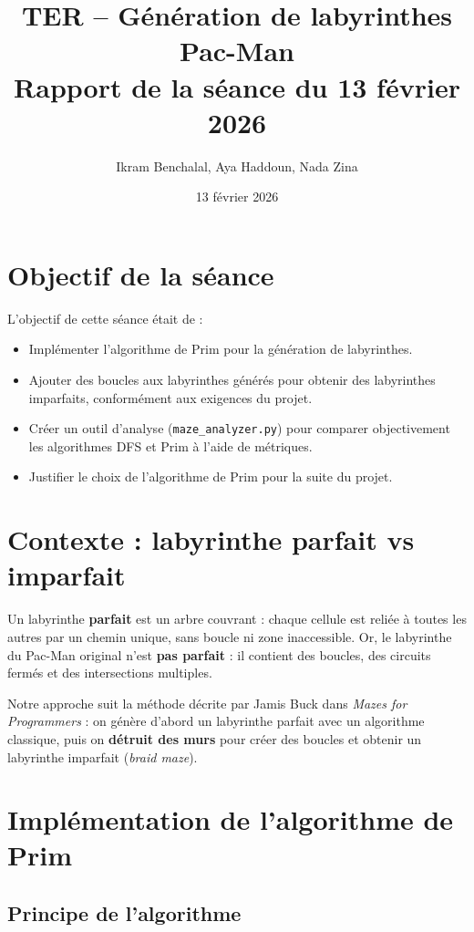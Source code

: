 \documentclass[12pt,a4paper]{article}
\title{TER -- Génération de labyrinthes Pac-Man\\
\large Rapport de la séance du 13 février 2026}
\author{Ikram Benchalal, Aya Haddoun, Nada Zina}
\date{13 février 2026}
\begin{document}
\maketitle

\section{Objectif de la séance}

L'objectif de cette séance était de :
\begin{itemize}
    \item Implémenter l'algorithme de Prim pour la génération de labyrinthes.
    \item Ajouter des boucles aux labyrinthes générés pour obtenir des labyrinthes imparfaits, conformément aux exigences du projet.
    \item Créer un outil d'analyse (\texttt{maze\_analyzer.py}) pour comparer objectivement les algorithmes DFS et Prim à l'aide de métriques.
    \item Justifier le choix de l'algorithme de Prim pour la suite du projet.
\end{itemize}

\section{Contexte : labyrinthe parfait vs imparfait}

Un labyrinthe \textbf{parfait} est un arbre couvrant : chaque cellule est reliée à toutes les autres par un chemin unique, sans boucle ni zone inaccessible. Or, le labyrinthe du Pac-Man original n'est \textbf{pas parfait} : il contient des boucles, des circuits fermés et des intersections multiples.

Notre approche suit la méthode décrite par Jamis Buck dans \textit{Mazes for Programmers} : on génère d'abord un labyrinthe parfait avec un algorithme classique, puis on \textbf{détruit des murs} pour créer des boucles et obtenir un labyrinthe imparfait (\textit{braid maze}).

\section{Implémentation de l'algorithme de Prim}

\subsection{Principe de l'algorithme}
\end{document}
